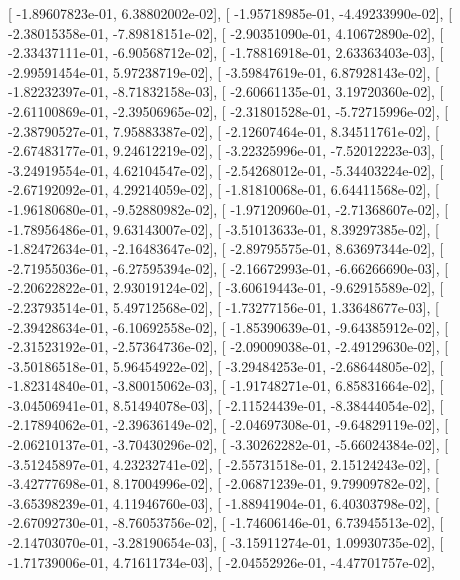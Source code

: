 \documentclass{article}
\begin{document}
       [ -1.89607823e-01,   6.38802002e-02],
       [ -1.95718985e-01,  -4.49233990e-02],
       [ -2.38015358e-01,  -7.89818151e-02],
       [ -2.90351090e-01,   4.10672890e-02],
       [ -2.33437111e-01,  -6.90568712e-02],
       [ -1.78816918e-01,   2.63363403e-03],
       [ -2.99591454e-01,   5.97238719e-02],
       [ -3.59847619e-01,   6.87928143e-02],
       [ -1.82232397e-01,  -8.71832158e-03],
       [ -2.60661135e-01,   3.19720360e-02],
       [ -2.61100869e-01,  -2.39506965e-02],
       [ -2.31801528e-01,  -5.72715996e-02],
       [ -2.38790527e-01,   7.95883387e-02],
       [ -2.12607464e-01,   8.34511761e-02],
       [ -2.67483177e-01,   9.24612219e-02],
       [ -3.22325996e-01,  -7.52012223e-03],
       [ -3.24919554e-01,   4.62104547e-02],
       [ -2.54268012e-01,  -5.34403224e-02],
       [ -2.67192092e-01,   4.29214059e-02],
       [ -1.81810068e-01,   6.64411568e-02],
       [ -1.96180680e-01,  -9.52880982e-02],
       [ -1.97120960e-01,  -2.71368607e-02],
       [ -1.78956486e-01,   9.63143007e-02],
       [ -3.51013633e-01,   8.39297385e-02],
       [ -1.82472634e-01,  -2.16483647e-02],
       [ -2.89795575e-01,   8.63697344e-02],
       [ -2.71955036e-01,  -6.27595394e-02],
       [ -2.16672993e-01,  -6.66266690e-03],
       [ -2.20622822e-01,   2.93019124e-02],
       [ -3.60619443e-01,  -9.62915589e-02],
       [ -2.23793514e-01,   5.49712568e-02],
       [ -1.73277156e-01,   1.33648677e-03],
       [ -2.39428634e-01,  -6.10692558e-02],
       [ -1.85390639e-01,  -9.64385912e-02],
       [ -2.31523192e-01,  -2.57364736e-02],
       [ -2.09009038e-01,  -2.49129630e-02],
       [ -3.50186518e-01,   5.96454922e-02],
       [ -3.29484253e-01,  -2.68644805e-02],
       [ -1.82314840e-01,  -3.80015062e-03],
       [ -1.91748271e-01,   6.85831664e-02],
       [ -3.04506941e-01,   8.51494078e-03],
       [ -2.11524439e-01,  -8.38444054e-02],
       [ -2.17894062e-01,  -2.39636149e-02],
       [ -2.04697308e-01,  -9.64829119e-02],
       [ -2.06210137e-01,  -3.70430296e-02],
       [ -3.30262282e-01,  -5.66024384e-02],
       [ -3.51245897e-01,   4.23232741e-02],
       [ -2.55731518e-01,   2.15124243e-02],
       [ -3.42777698e-01,   8.17004996e-02],
       [ -2.06871239e-01,   9.79909782e-02],
       [ -3.65398239e-01,   4.11946760e-03],
       [ -1.88941904e-01,   6.40303798e-02],
       [ -2.67092730e-01,  -8.76053756e-02],
       [ -1.74606146e-01,   6.73945513e-02],
       [ -2.14703070e-01,  -3.28190654e-03],
       [ -3.15911274e-01,   1.09930735e-02],
       [ -1.71739006e-01,   4.71611734e-03],
       [ -2.04552926e-01,  -4.47701757e-02],
\end{document}
